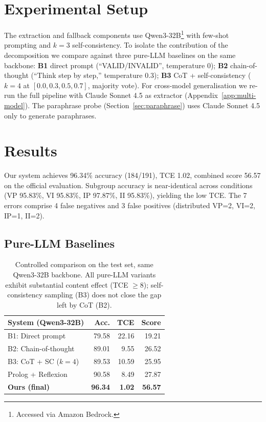 \documentclass[11pt]{article}
\begin{document}
\section{Experimental Setup}

The extraction and fallback components use Qwen3-32B\footnote{Accessed via Amazon Bedrock.} with few-shot prompting and $k=3$ self-consistency. To isolate the contribution of the decomposition we compare against three pure-LLM baselines on the same backbone: \textbf{B1} direct prompt (``VALID/INVALID'', temperature 0); \textbf{B2} chain-of-thought (``Think step by step,'' temperature 0.3); \textbf{B3} CoT + self-consistency ($k=4$ at $[0.0, 0.3, 0.5, 0.7]$, majority vote). For cross-model generalisation we re-run the full pipeline with Claude Sonnet 4.5 as extractor (Appendix~\ref{app:multi-model}). The paraphrase probe (Section~\ref{sec:paraphrase}) uses Claude Sonnet 4.5 only to generate paraphrases.


\section{Results}
\label{sec:results}

Our system achieves 96.34\% accuracy (184/191), TCE 1.02, combined score 56.57 on the official evaluation. Subgroup accuracy is near-identical across conditions (VP 95.83\%, VI 95.83\%, IP 97.87\%, II 95.83\%), yielding the low TCE. The 7 errors comprise 4 false negatives and 3 false positives (distributed VP=2, VI=2, IP=1, II=2).

\subsection{Pure-LLM Baselines}
\label{sec:baselines}

\begin{table}[t]
\centering
\small
\setlength{\tabcolsep}{4pt}
\begin{tabular}{@{}lrrr@{}}
\toprule
\textbf{System (Qwen3-32B)} & \textbf{Acc.} & \textbf{TCE} & \textbf{Score} \\
\midrule
B1: Direct prompt    & 79.58 & 22.16 & 19.21 \\
B2: Chain-of-thought & 89.01 &  9.55 & 26.52 \\
B3: CoT + SC ($k=4$) & 89.53 & 10.59 & 25.95 \\
Prolog + Reflexion   & 90.58 &  8.49 & 27.87 \\
\textbf{Ours (final)} & \textbf{96.34} & \textbf{1.02} & \textbf{56.57} \\
\bottomrule
\end{tabular}
\caption{Controlled comparison on the test set, same Qwen3-32B backbone. All pure-LLM variants exhibit substantial content effect (TCE $\geq 8$); self-consistency sampling (B3) does not close the gap left by CoT (B2).}
\label{tab:baselines}
\end{table}
\end{document}
